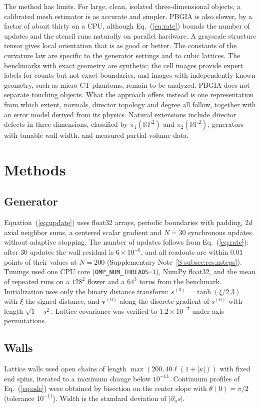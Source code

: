 \documentclass[11pt,a4paper]{article}
\newcommand{\vv}{\bm v}
\newcommand{\RP}{\mathbb{RP}}
\begin{document}
The method has limits. For large, clean, isolated three-dimensional objects, a calibrated mesh estimator is as accurate and simpler. PBGIA is also slower, by a factor of about thirty on a CPU, although Eq.~(\ref{eq:rate}) bounds the number of updates and the stencil runs naturally on parallel hardware. A grayscale structure tensor gives local orientation that is as good or better. The constants of the curvature law are specific to the generator settings and to cubic lattices. The benchmarks with exact geometry are synthetic; the cell images provide expert labels for counts but not exact boundaries, and images with independently known geometry, such as micro-CT phantoms, remain to be analyzed. PBGIA does not separate touching objects. What the approach offers instead is one representation from which extent, normals, director topology and degree all follow, together with an error model derived from its physics. Natural extensions include director defects in three dimensions, classified by $\pi_1(\RP^2)$ and $\pi_2(\RP^2)$, generators with tunable wall width, and measured partial-volume data.

\section*{Methods}
\subsection*{Generator}
Equation~(\ref{eq:update}) uses float32 arrays, periodic boundaries with padding, $2d$ axial neighbor sums, a centered scalar gradient and $N=30$ synchronous updates without adaptive stopping. The number of updates follows from Eq.~(\ref{eq:rate}): after 30 updates the wall residual is $6\times10^{-6}$, and all readouts are within $0.01$ points of their values at $N=200$ (Supplementary Note~\ref{S-subsec:res:nsteps}). Timings used one CPU core (\texttt{OMP\_NUM\_THREADS=1}), NumPy float32, and the mean of repeated runs on a $128^2$ flower and a $64^3$ torus from the benchmark. Initialization uses only the binary distance transform: $s^{(0)}=\tanh(\xi/2.3)$ with $\xi$ the signed distance, and $\vv^{(0)}$ along the discrete gradient of $s^{(0)}$ with length $\sqrt{1-s^2}$. Lattice covariance was verified to $1.2\times10^{-7}$ under axis permutations.

\subsection*{Walls}
Lattice walls used open chains of length $\max(200,40\ell(1+|\kappa|))$ with fixed end spins, iterated to a maximum change below $10^{-13}$. Continuum profiles of Eq.~(\ref{eq:ode}) were obtained by bisection on the center slope with $\theta(0)=\pi/2$ (tolerance $10^{-11}$). Width is the standard deviation of $|\partial_us|$.
\end{document}
